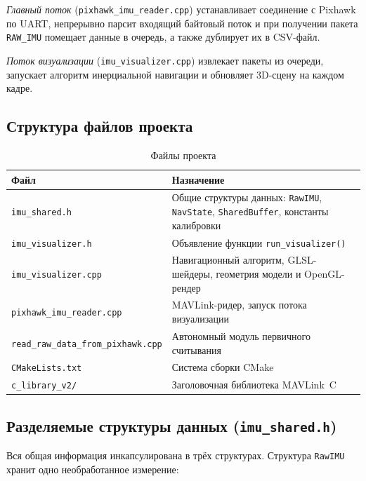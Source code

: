\textit{Главный поток} (\texttt{pixhawk\_imu\_reader.cpp}) устанавливает
соединение с Pixhawk по UART, непрерывно парсит входящий байтовый поток
и при получении пакета \texttt{RAW\_IMU} помещает данные в очередь, а также
дублирует их в CSV-файл.
 
\textit{Поток визуализации} (\texttt{imu\_visualizer.cpp}) извлекает пакеты
из очереди, запускает алгоритм инерциальной навигации и обновляет 3D-сцену на
каждом кадре.
 
\subsection{Структура файлов проекта}
 
\begin{table}[H]
\centering
\caption{Файлы проекта}
\label{tab:files}
\begin{tabularx}{\textwidth}{|l|X|}
\hline
\textbf{Файл} & \textbf{Назначение} \\
\hline
\texttt{imu\_shared.h}            & Общие структуры данных: \texttt{RawIMU},
                                    \texttt{NavState}, \texttt{SharedBuffer},
                                    константы калибровки \\
\hline
\texttt{imu\_visualizer.h}        & Объявление функции \texttt{run\_visualizer()} \\
\hline
\texttt{imu\_visualizer.cpp}      & Навигационный алгоритм, GLSL-шейдеры,
                                    геометрия модели и OpenGL-рендер \\
\hline
\texttt{pixhawk\_imu\_reader.cpp} & MAVLink-ридер, запуск потока визуализации \\
\hline
\texttt{read\_raw\_data\_from\_pixhawk.cpp} & Автономный модуль первичного считывания \\
\hline
\texttt{CMakeLists.txt}           & Система сборки CMake \\
\hline
\texttt{c\_library\_v2/}          & Заголовочная библиотека MAVLink~C~\cite{mavlink_docs} \\
\hline
\end{tabularx}
\end{table}
 
\subsection{Разделяемые структуры данных (\texttt{imu\_shared.h})}
 
Вся общая информация инкапсулирована в трёх структурах. Структура
\texttt{RawIMU} хранит одно необработанное измерение:
 
